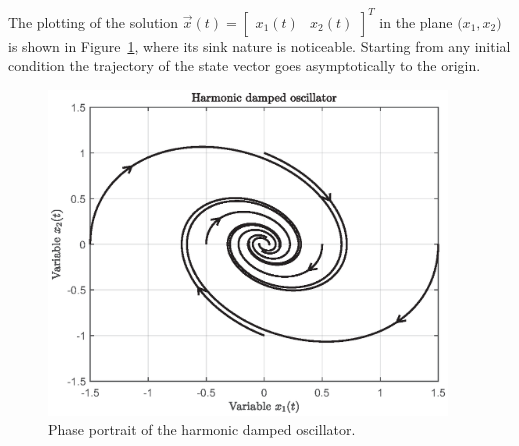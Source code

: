 \documentclass[11pt,a4paper,oneside]{book}
\numberwithin{equation}{section}
\theoremstyle{it}
\theoremstyle{definition}
\begin{document}
The plotting of the solution $\vec{x}(t) = \begin{bmatrix} x_1(t) & x_2(t) 
\end{bmatrix}^T$ in the plane $\big(x_1 , x_2\big)$ is shown in 
Figure~\ref{armonic_damped_oscillator}, where its sink nature is noticeable. 
Starting from any initial condition the trajectory of the state vector goes 
asymptotically to the origin.
\begin{figure}[H]
	\centering
	\includegraphics[width = 300pt, 
	keepaspectratio]{figures/ljapunov/harmonic_damped_oscillator.eps}
	\captionsetup{width=0.75\textwidth}		
	\caption{Phase portrait of the harmonic damped oscillator.}
	\label{armonic_damped_oscillator}
\end{figure}
\end{document}
